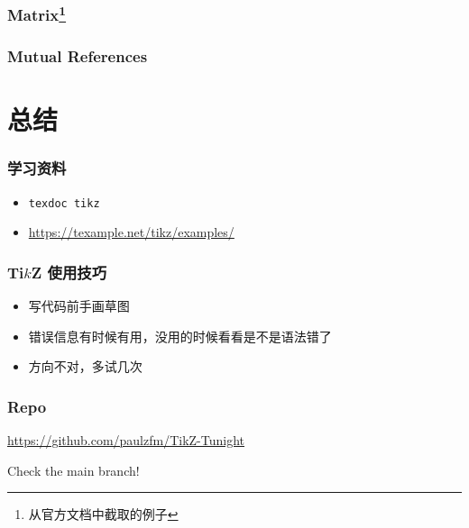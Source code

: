 \documentclass[usenames,xcolor=svgnames,11pt,sans,handout]{beamer}
\newcommand{\key}[1]{{\color{theme} #1}}
\let\t\texttt
\begin{document}
\begin{frame}
    \frametitle{Matrix\footnote{从官方文档中截取的例子}}

    \centering
\end{frame}

\begin{frame}[fragile]
    \frametitle{Mutual References}

    

    \begin{center}
    \end{center}
\end{frame}

\section{总结}

\begin{frame}
    \frametitle{学习资料}

    \begin{itemize}
        \item \t{texdoc tikz}
        \item \url{https://texample.net/tikz/examples/}
    \end{itemize}
\end{frame}

\begin{frame}
    \frametitle{Ti$k$Z 使用技巧}

    \begin{itemize}
        \item 写代码前手画草图
        \pause
        \item 错误信息有时候有用，没用的时候看看是不是语法错了
        \pause
        \item 方向不对，多试几次
    \end{itemize}
\end{frame}

\begin{frame}
    \frametitle{Repo}

    \centering\Large
    
    \url{https://github.com/paulzfm/TikZ-Tunight}

    \vspace{10pt}
    Check the \key{main} branch!
\end{frame}
\end{document}
